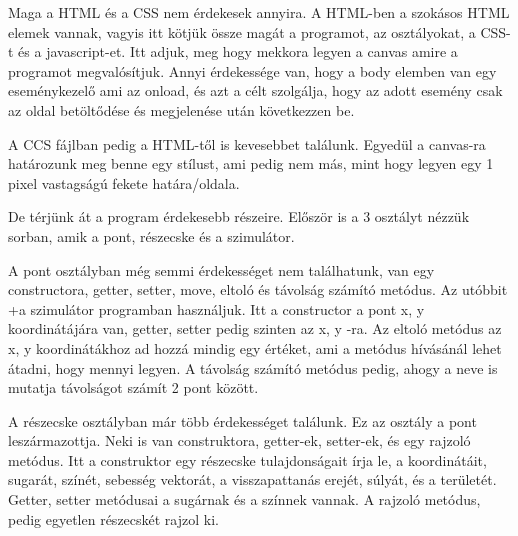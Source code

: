 Maga a HTML és a CSS nem érdekesek annyira. A HTML-ben a szokásos HTML elemek vannak, vagyis itt kötjük össze magát a programot, az osztályokat, a CSS-t és a javascript-et. Itt adjuk, meg hogy mekkora legyen a canvas amire a programot megvalósítjuk. Annyi érdekessége van, hogy a body elemben van egy eseménykezelő ami az onload, és azt a célt szolgálja, hogy az adott esemény csak az oldal betöltődése és megjelenése után következzen be. 

A CCS fájlban pedig a HTML-től is kevesebbet találunk. Egyedül a canvas-ra határozunk meg benne egy stílust, ami pedig nem más, mint hogy legyen egy 1 pixel vastagságú fekete határa/oldala.

De térjünk át a program érdekesebb részeire. Először is a 3 osztályt nézzük sorban, amik a pont, részecske és a szimulátor. 

A pont osztályban még semmi érdekességet nem találhatunk, van egy constructora, getter, setter, move, eltoló és távolság számító metódus. Az utóbbit 
+a szimulátor programban használjuk. Itt a constructor a pont x, y koordinátájára van, getter, setter pedig szinten az x, y -ra. Az eltoló metódus az x, y koordinátákhoz ad hozzá mindig egy értéket, ami a metódus hívásánál lehet átadni, hogy mennyi legyen. A távolság számító metódus pedig, ahogy a neve is mutatja távolságot számít 2 pont között.

A részecske osztályban már több érdekességet találunk. Ez az osztály a pont leszármazottja. Neki is van construktora, getter-ek, setter-ek, és egy rajzoló metódus. Itt a construktor egy részecske tulajdonságait írja le, a koordinátáit, sugarát, színét, sebesség vektorát, a visszapattanás erejét, súlyát, és a területét. Getter, setter metódusai a sugárnak és a színnek vannak. A rajzoló metódus, pedig egyetlen részecskét rajzol ki. 

